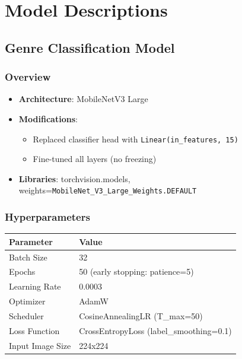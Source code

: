 \documentclass[
  letterpaper,
  DIV=11,
  numbers=noendperiod]{scrreprt}
\providecommand{\tightlist}{%
  \setlength{\itemsep}{0pt}\setlength{\parskip}{0pt}}
\begin{document}
\section{Model Descriptions}\label{model-descriptions}

\subsection{Genre Classification
Model}\label{genre-classification-model}

\subsubsection{Overview}\label{overview}

\begin{itemize}
\tightlist
\item
  \textbf{Architecture}: MobileNetV3 Large
\item
  \textbf{Modifications}:

  \begin{itemize}
  \tightlist
  \item
    Replaced classifier head with \texttt{Linear(in\_features,\ 15)}
  \item
    Fine-tuned all layers (no freezing)
  \end{itemize}
\item
  \textbf{Libraries}: torchvision.models,
  weights=\texttt{MobileNet\_V3\_Large\_Weights.DEFAULT}
\end{itemize}

\subsubsection{Hyperparameters}\label{hyperparameters}

\begin{longtable}[]{@{}ll@{}}
\toprule\noalign{}
Parameter & Value \\
\midrule\noalign{}
\endhead
\bottomrule\noalign{}
\endlastfoot
Batch Size & 32 \\
Epochs & 50 (early stopping: patience=5) \\
Learning Rate & 0.0003 \\
Optimizer & AdamW \\
Scheduler & CosineAnnealingLR (T\_max=50) \\
Loss Function & CrossEntropyLoss (label\_smoothing=0.1) \\
Input Image Size & 224x224 \\
\end{longtable}
\end{document}
